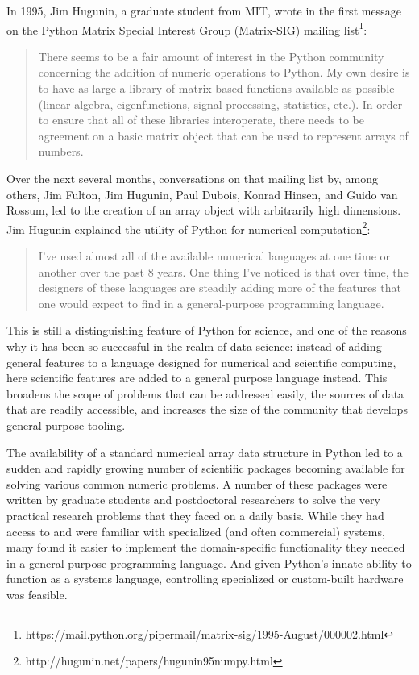\documentclass[fleqn,10pt]{wlscirep}
\begin{document}
In 1995, Jim Hugunin, a graduate student from MIT, wrote in the first
message on the Python Matrix Special Interest Group (Matrix-SIG)
mailing list\footnote{https://mail.python.org/pipermail/matrix-sig/1995-August/000002.html}:
\begin{quote}
There seems to be a fair amount of interest in the Python community
concerning the addition of numeric operations to Python.  My own desire is
to have as large a library of matrix based functions available as possible
(linear algebra, eigenfunctions, signal processing, statistics, etc.).  In
order to ensure that all of these libraries interoperate, there needs to
be agreement on a basic matrix object that can be used to represent arrays
of numbers.
\end{quote}
Over the next several months, conversations on that mailing
list by, among others, Jim Fulton, Jim Hugunin, Paul Dubois, Konrad
Hinsen, and Guido van Rossum, led to the creation of an array object
with arbitrarily high dimensions.  Jim Hugunin explained the utility
of Python for numerical computation\footnote{http://hugunin.net/papers/hugunin95numpy.html}:
\begin{quote}
I've used almost all of the available numerical languages at one time
or another over the past 8 years. One thing I've noticed is that over
time, the designers of these languages are steadily adding more of the
features that one would expect to find in a general-purpose
programming language.
\end{quote}
This is still a distinguishing feature of Python for science, and one of the
reasons why it has been so successful in the realm of data science: instead of
adding general features to a language designed for numerical and scientific
computing, here scientific features are added to a general purpose language
instead.  This broadens the scope of problems that can be addressed easily, the
sources of data that are readily accessible, and increases the size of the
community that develops general purpose tooling.

The availability of a standard numerical array data structure in
Python led to a sudden and rapidly growing number of scientific
packages becoming available for solving various common numeric
problems.
A number of these packages were written by graduate students and
postdoctoral researchers to solve the very practical research problems
that they faced on a daily basis.  While they had access to and were
familiar with specialized (and often commercial) systems, many found
it easier to implement the domain-specific functionality they needed
in a general purpose programming language.  And given Python's innate
ability to function as a systems language, controlling specialized or
custom-built hardware was feasible.
\end{document}
